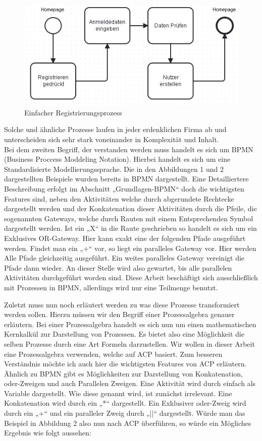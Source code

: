 \begin{figure}
\centering
\includegraphics[scale=0.7]{Figures/Einleitungbsp2}
\decoRule
\caption[Einfacher Registrierungsprozess]{Einfacher Registrierungsprozess}
\label{fig:Task}
\end{figure}
Solche und ähnliche Prozesse laufen in jeder erdenklichen Firma ab und unterscheiden sich sehr stark voneinander in Komplexität und Inhalt.\\
Bei dem zweiten Begriff, der verstanden werden muss handelt es sich um BPMN (Business Proccess Moddeling Notation). Hierbei handelt es sich um eine Standardisierte Modellierungssprache. Die in den Abbildungen 1 und 2 dargestellten Beispiele wurden bereits in BPMN dargestellt. Eine Detailliertere Beschreibung erfolgt im Abschnitt „Grundlagen-BPMN“ doch die wichtigsten Features sind, neben den Aktivitäten welche durch abgerundete Rechtecke dargestellt werden und der Konkatenation dieser Aktivitäten durch die Pfeile, die sogenannten Gateways, welche durch Rauten mit einem Entsprechenden Symbol dargestellt werden. Ist ein „X“ in die Raute geschrieben so handelt es sich um ein Exklusives OR-Gateway. Hier kann exakt eine der folgenden Pfade ausgeführt werden. Findet man ein „+“ vor, so liegt ein paralleles Gateway vor. Hier werden Alle Pfade gleichzeitig ausgeführt. Ein weites paralleles Gateway vereinigt die Pfade dann wieder. An dieser Stelle wird also gewartet, bis alle parallelen Aktivitäten durchgeführt worden sind. Diese Arbeit beschäftigt sich ausschließlich mit Prozessen in BPMN, allerdings wird nur eine Teilmenge benutzt.

Zuletzt muss nun noch erläutert werden zu was diese Prozesse transformiert werden sollen. Hierzu müssen wir den Begriff einer Prozessalgebra genauer erläutern. Bei einer Prozessalgebra handelt es sich nun um einen mathematischen Kernkalkül zur Darstellung von Prozessen. Es bietet also eine Möglichkeit die selben Prozesse durch eine Art Formeln darzustellen. Wir wollen in dieser Arbeit eine Prozessalgebra verwenden, welche auf ACP basiert.  Zum besseren Verständnis möchte ich auch hier die wichtigsten Features von ACP erläutern. Ähnlich zu BPMN gibt es Möglichkeiten zur Darstellung von Konkatenation, oder-Zweigen und auch Parallelen Zweigen. Eine Aktivität wird durch einfach als Variable dargestellt. Wie diese genannt wird, ist zunächst irrelevant. Eine Konkatenation wird durch ein „*“ dargestellt. Ein Exklusiver oder-Zweig wird durch ein „+“ und ein paralleler Zweig durch „||“ dargestellt. Würde man das Beispiel in Abbildung 2 also nun nach ACP überführen, so würde ein Mögliches Ergebnis wie folgt aussehen: 

